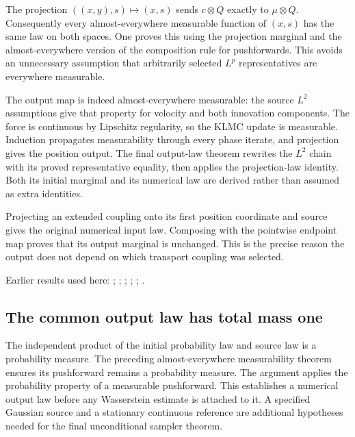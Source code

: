 \documentclass[11pt,a4paper]{report}
\begin{document}
The projection \(((x,y),s)\mapsto(x,s)\) sends \(c\otimes Q\) exactly to \(\mu\otimes Q\). Consequently every almost-everywhere measurable function of \((x,s)\) has the same law on both spaces. One proves this using the projection marginal and the almost-everywhere version of the composition rule for pushforwards. This avoids an unnecessary assumption that arbitrarily selected \(L^p\) representatives are everywhere measurable.



The output map is indeed almost-everywhere measurable: the source \(L^{2}\) assumptions give that property for velocity and both innovation components. The force is continuous by Lipschitz regularity, so the KLMC update is measurable. Induction propagates measurability through every phase iterate, and projection gives the position output. The final output-law theorem rewrites the \(L^{2}\) chain with its proved representative equality, then applies the projection-law identity. Both its initial marginal and its numerical law are derived rather than assumed as extra identities.



Projecting an extended coupling onto its first position coordinate and source gives the original numerical input law. Composing with the pointwise endpoint map proves that its output marginal is unchanged. This is the precise reason the output does not depend on which transport coupling was selected.



Earlier results used here: \cite[Section~3.13.2]{LangevinLean2026ULASC}; \cite[Section~3.17.1]{LangevinLean2026ULASC}; \cite[Section~3.17.2]{LangevinLean2026ULASC}; \cite[Section~3.22.19]{LangevinLean2026ULASC}; \cite[Section~3.22.2]{LangevinLean2026ULASC}; \cite[Section~3.22.9]{LangevinLean2026ULASC}.
\subsection{\texorpdfstring{The common output law has total mass one}{The common output law has total mass one}}
\label{report-step-KineticLangevin-ProductLaw-lean-6}


The independent product of the initial probability law and source law is a probability measure. The preceding almost-everywhere measurability theorem ensures its pushforward remains a probability measure. The argument applies the probability property of a measurable pushforward. This establishes a numerical output law before any Wasserstein estimate is attached to it. A specified Gaussian source and a stationary continuous reference are additional hypotheses needed for the final unconditional sampler theorem.
\end{document}
